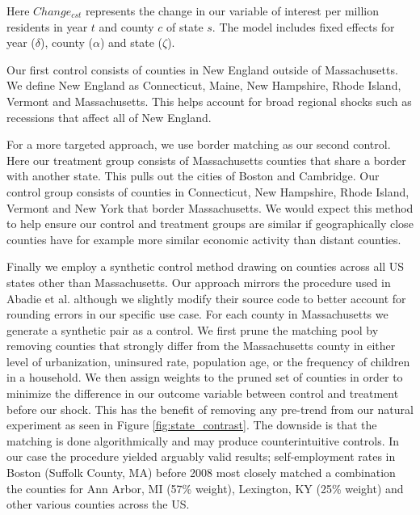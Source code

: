 Here $Change_{cst}$ represents the change in our variable of interest per million residents in year $t$ and county $c$ of state $s$. The model includes fixed effects for year ($\delta$), county ($\alpha$) and state ($\zeta$).

Our first control consists of counties in New England outside of Massachusetts. We define New England as Connecticut, Maine, New Hampshire, Rhode Island, Vermont and Massachusetts. This helps account for broad regional shocks such as recessions that affect all of New England. 

For a more targeted approach, we use border matching as our second control. Here our treatment group consists of Massachusetts counties that share a border with another state. This pulls out the cities of Boston and Cambridge. Our control group consists of counties in Connecticut, New Hampshire, Rhode Island, Vermont and New York that border Massachusetts. We would expect this method to help ensure our control and treatment groups are similar if geographically close counties  have for example more similar economic activity than distant counties. 

Finally we employ a synthetic control method drawing on counties across all US states other than Massachusetts. Our approach mirrors the procedure used in Abadie et al. \cite{abadie} although we slightly modify their source code to better account for rounding errors in our specific use case. For each county in Massachusetts we generate a synthetic pair as a control. We first prune the matching pool by removing counties that strongly differ from the Massachusetts county in either level of urbanization, uninsured rate, population age, or the frequency of children in a household. We then assign weights to the pruned set of counties in order to minimize the difference in our outcome variable between control and treatment before our shock. This has the benefit of removing any pre-trend from our natural experiment as seen in Figure \ref{fig:state_contrast}. The downside is that the matching is done algorithmically and may produce counterintuitive controls. In our case the procedure yielded arguably valid results; self-employment rates in Boston (Suffolk County, MA) before 2008 most closely matched a combination the counties for Ann Arbor, MI (57\% weight), Lexington, KY (25\% weight) and other various counties across the US. 

